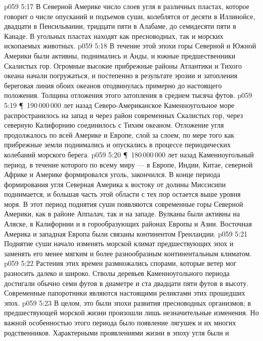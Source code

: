 \vs p059 5:17 В Северной Америке число слоев угля в различных пластах, которое говорит о числе опусканий и подъемов суши, колеблятся от десяти в Иллинойсе, двадцати в Пенсильвании, тридцати пяти в Алабаме, до семидесяти пяти в Канаде. В угольных пластах находят как пресноводных, так и морских ископаемых животных.
\vs p059 5:18 В течение этой эпохи горы Северной и Южной Америки были активны, поднимались и Анды, и южные предшественники Скалистых гор. Огромные высокие прибрежные районы Атлантики и Тихого океана начали погружаться, и постепенно в результате эрозии и затопления береговая линия обоих океанов отодвинулась примерно до настоящего положения. Толщина отложения этого затопления в среднем тысяча футов.
\vs p059 5:19 \P\ 190\,000\,000 лет назад Северо\hyp{}Американское Каменноугольное море распространилось на запад и через район современных Скалистых гор, через северную Калифорнию соединилось с Тихим океаном. Отложение угля продолжалось по всей Америке и Европе, слой за слоем, по мере того как прибрежные земли поднимались и опускались в процессе периодических колебаний морского берега.
\vs p059 5:20 \P\ 180\,000\,000 лет назад Каменноугольный период, в течение которого по всему миру --- в Европе, Индии, Китае, северной Африке и Америке формировался уголь, закончился. В конце периода формирования угля Северная Америка к востоку от долины Миссисипи поднимается, и большая часть этой области с тех пор остается выше уровня моря. В этот период поднятия суши появляются современные горы Северной Америки, как в районе Аппалач, так и на западе. Вулканы были активны на Аляске, в Калифорнии и в горообразующих районах Европы и Азии. Восточная Америка и западная Европа были связаны континентом Гренландии.
\vs p059 5:21 Поднятие суши начало изменять морской климат предшествующих эпох и заменять его менее мягким и более разнообразным континентальным климатом.
\vs p059 5:22 Растения этих времен размножались спорами, которые ветер мог разносить далеко и широко. Стволы деревьев Каменноугольного периода достигали обычно семи футов в диаметре и ста двадцати пяти футов в высоту. Современные папоротники являются настоящими реликтами этих прошедших эпох.
\vs p059 5:23 В целом, это были эпохи развития пресноводных организмов; в предшествующей морской жизни произошли лишь незначительные изменения. Но важной особенностью этого периода было  появление лягушек и их многих родственников. Характерными проявлениями жизни в эпоху угля были  и 
